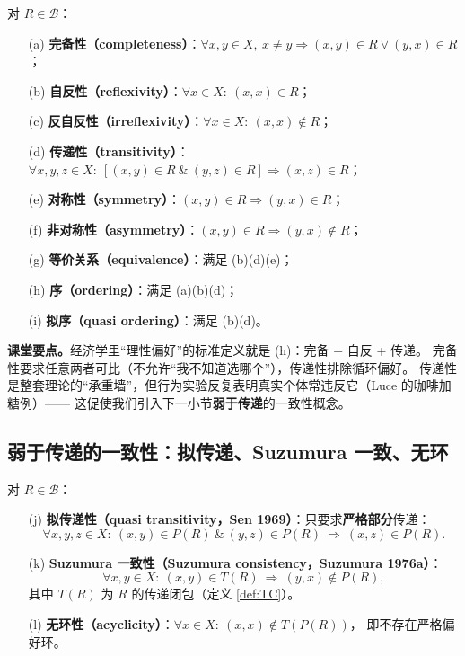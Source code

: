 \begin{definition}[二元关系的标准性质]
对 $R\in\mathcal{B}$：
\begin{enumerate}
  \item[(a)] \textbf{完备性（completeness）}：$\forall x,y\in X,\ x\neq y \Rightarrow (x,y)\in R \vee (y,x)\in R$；
  \item[(b)] \textbf{自反性（reflexivity）}：$\forall x\in X:\ (x,x)\in R$；
  \item[(c)] \textbf{反自反性（irreflexivity）}：$\forall x\in X:\ (x,x)\notin R$；
  \item[(d)] \textbf{传递性（transitivity）}：$\forall x,y,z\in X:\ [(x,y)\in R \ \&\ (y,z)\in R] \Rightarrow (x,z)\in R$；
  \item[(e)] \textbf{对称性（symmetry）}：$(x,y)\in R \Rightarrow (y,x)\in R$；
  \item[(f)] \textbf{非对称性（asymmetry）}：$(x,y)\in R \Rightarrow (y,x)\notin R$；
  \item[(g)] \textbf{等价关系（equivalence）}：满足 (b)(d)(e)；
  \item[(h)] \textbf{序（ordering）}：满足 (a)(b)(d)；
  \item[(i)] \textbf{拟序（quasi ordering）}：满足 (b)(d)。
\end{enumerate}
\end{definition}

\noindent\textbf{课堂要点。}经济学里“理性偏好”的标准定义就是 (h)：完备 + 自反 + 传递。
完备性要求任意两者可比（不允许“我不知道选哪个”），传递性排除循环偏好。
传递性是整套理论的“承重墙”，但行为实验反复表明真实个体常违反它（Luce 的咖啡加糖例）——
这促使我们引入下一小节\textbf{弱于传递}的一致性概念。

\subsection{弱于传递的一致性：拟传递、Suzumura 一致、无环}

\begin{definition}[三种弱化的一致性条件]\label{def:weakcoherence}
对 $R\in\mathcal{B}$：
\begin{enumerate}
  \item[(j)] \textbf{拟传递性（quasi transitivity，Sen 1969）}：只要求\textbf{严格部分}传递：
  \[
    \forall x,y,z\in X:\ (x,y)\in P(R)\ \&\ (y,z)\in P(R)\ \Rightarrow\ (x,z)\in P(R).
  \]
  \item[(k)] \textbf{Suzumura 一致性（Suzumura consistency，Suzumura 1976a）}：
  \[
    \forall x,y\in X:\ (x,y)\in T(R)\ \Rightarrow\ (y,x)\notin P(R),
  \]
  其中 $T(R)$ 为 $R$ 的传递闭包（定义 \ref{def:TC}）。
  \item[(l)] \textbf{无环性（acyclicity）}：$\forall x\in X:\ (x,x)\notin T(P(R))$，
  即不存在严格偏好环。
\end{enumerate}
\end{definition}


